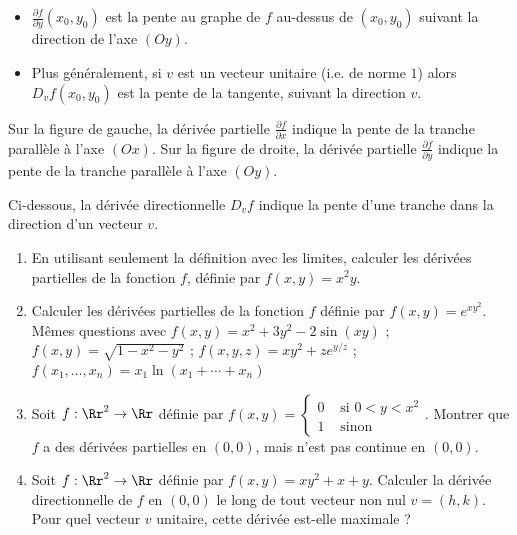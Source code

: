 \documentclass[12pt, class=report,crop=false]{standalone}
\begin{document}
{\begin{itemize}
 \item $\frac{\partial f}{\partial y} (x_0,y_0)$ est la pente au graphe de $f$
 au-dessus de $(x_0,y_0)$ suivant la direction de l'axe $(Oy)$.
 
 \item Plus généralement, si $v$ est un vecteur unitaire (i.e. de norme $1$) alors
 $D_vf(x_0,y_0)$ est la pente de la tangente, suivant la direction $v$.
\end{itemize}

 
 
\bigskip 
Sur la figure de gauche, la dérivée partielle  $\frac{\partial f}{\partial x}$ indique la pente de la tranche parallèle à l'axe $(Ox)$. Sur la figure de droite, la dérivée partielle  $\frac{\partial f}{\partial y}$ indique la pente de la tranche parallèle à l'axe $(Oy)$.



Ci-dessous, la dérivée directionnelle $D_vf$ indique la pente d'une tranche  dans la direction d'un vecteur $v$.


\bigskip

\begin{miniexercices}
\sauteligne
\begin{enumerate}
  \item En utilisant seulement la définition avec les limites, calculer les dérivées partielles de la fonction $f$, définie par $f(x,y) = x^2y$.
  
  \item Calculer les dérivées partielles de la fonction $f$ définie par  $f(x,y) = e^{xy^2}$. Mêmes questions avec $f(x,y) = x^2 + 3y^2 - 2\sin(xy)$ ; $f(x,y) = \sqrt{1 - x^2 - y^2}$ ; $f(x,y,z) = xy^2 + ze^{y/z}$ ; $f(x_1,\ldots,x_n)= x_1\ln(x_1+\cdots+x_n)$

  \item Soit $f : \Rr^2 \to \Rr$ définie par $f(x,y) = \left \lbrace
\begin{array}{cc}
0 & \text{ si }  0 < y < x^2 \\
1 & \text{ sinon}
\end{array}
\right.$.
Montrer que $f$ a des dérivées partielles en $(0,0)$, mais n'est pas continue en $(0,0)$.

  \item Soit $f : \Rr^2 \to \Rr$ définie par $f(x,y) = xy^2+x+y$. Calculer la dérivée directionnelle de $f$ en $(0,0)$ le long de tout vecteur non nul $v=(h,k)$. Pour quel vecteur $v$ unitaire, cette dérivée est-elle maximale ?
  

\end{enumerate}
\end{miniexercices}}
\end{document}
